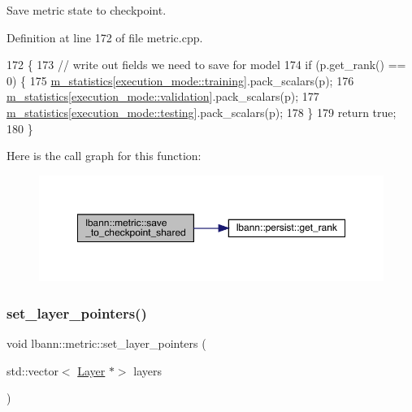 Save metric state to checkpoint. 

Definition at line 172 of file metric.\+cpp.


\begin{DoxyCode}
172                                                  \{
173   \textcolor{comment}{// write out fields we need to save for model}
174   \textcolor{keywordflow}{if} (p.get\_rank() == 0) \{
175     \hyperlink{classlbann_1_1metric_a9949d8aceedbc113aa2c356046ed73fc}{m\_statistics}[\hyperlink{base_8hpp_a2781a159088df64ed7d47cc91c4dc0a8ac185ddac8b5a8f5aa23c5b80bc12d214}{execution\_mode::training}].pack\_scalars(p);
176     \hyperlink{classlbann_1_1metric_a9949d8aceedbc113aa2c356046ed73fc}{m\_statistics}[\hyperlink{base_8hpp_a2781a159088df64ed7d47cc91c4dc0a8aa617908b172c473cb8e8cda059e55bf0}{execution\_mode::validation}].pack\_scalars(p);
177     \hyperlink{classlbann_1_1metric_a9949d8aceedbc113aa2c356046ed73fc}{m\_statistics}[\hyperlink{base_8hpp_a2781a159088df64ed7d47cc91c4dc0a8aae2b1fca515949e5d54fb22b8ed95575}{execution\_mode::testing}].pack\_scalars(p);
178   \}
179   \textcolor{keywordflow}{return} \textcolor{keyword}{true};
180 \}
\end{DoxyCode}
Here is the call graph for this function\+:\nopagebreak
\begin{figure}[H]
\begin{center}
\leavevmode
\includegraphics[width=350pt]{classlbann_1_1metric_a9728b02a240dfd9faa61b7dfeb3feede_cgraph}
\end{center}
\end{figure}
\mbox{\label{classlbann_1_1metric_a5de0c336b93f2c03f37f38047d401f99}} 
\subsubsection{\texorpdfstring{set\+\_\+layer\+\_\+pointers()}{set\_layer\_pointers()}}
{\footnotesize\ttfamily void lbann\+::metric\+::set\+\_\+layer\+\_\+pointers (\begin{DoxyParamCaption}\item[{std\+::vector$<$ \hyperlink{classlbann_1_1Layer}{Layer} $\ast$$>$}]{layers }\end{DoxyParamCaption})}


